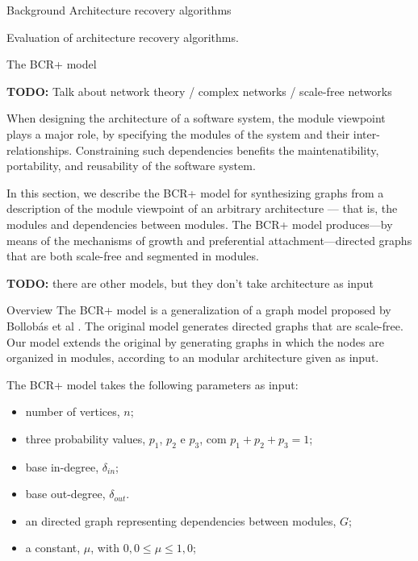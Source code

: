 \documentclass[11pt,twocolumn,a4paper,english]{article}
\newcommand{\TODO}{\textbf{TODO:} }
\begin{document}

\begin{section}{Background}
	Architecture recovery algorithms

	Evaluation of architecture recovery algorithms. 
	
\end{section}


\begin{section}{The BCR+ model}	
	\newcommand{\din}[0]{\ensuremath{\delta_{in}}}
	\newcommand{\dout}[0]{\ensuremath{\delta_{out}}}
	\newcommand{\gin}[0]{\ensuremath{\mathrm{g}_{in}}}
	\newcommand{\gout}[0]{\ensuremath{\mathrm{g}_{out}}}
	
	\TODO Talk about network theory / complex networks / scale-free networks 

	When designing the architecture of a software system, the module viewpoint plays a major role, by specifying the modules of the system and their inter-relationships. Constraining such dependencies benefits the maintenatibility, portability, and reusability of the software system.
	
	In this section, we describe the BCR+ model for synthesizing graphs from a description of the module viewpoint of an arbitrary architecture --- that is, the modules and dependencies between modules. The BCR+ model produces---by means of the mechanisms of growth and preferential attachment---directed graphs that are both scale-free and segmented in modules.
	
	\TODO there are other models, but they don't take architecture as input	
	
\begin{subsection}{Overview}
	The BCR+ model is a generalization of a graph model proposed by Bollobás et al \cite{Bollobas2003}. The original model generates directed graphs that are scale-free. Our model extends the original by generating graphs in which the nodes are organized in modules, according to an modular architecture given as input.
	
	The BCR+ model takes the following parameters as input:
	
	\begin{itemize}
  \item number of vertices, $n$;
  \item three probability values, $p_1$, $p_2$ e $p_3$, com $p_1 + p_2 + p_3 = 1$;
  \item base in-degree, $\din$;
  \item base out-degree, $\dout$.
  \item an directed graph representing dependencies between modules, $G$;
  \item a constant, $\mu$, with $0,0 \le \mu \le 1,0$;
  \end{itemize}
  

\end{subsection}
\end{section}
\end{document}
